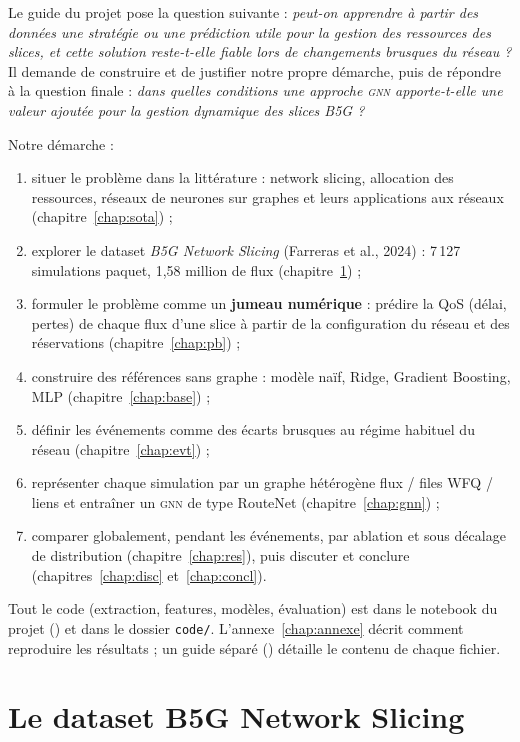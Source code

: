 \documentclass[11pt,a4paper]{report}
\newcommand{\gnn}{\textsc{gnn}}
\begin{document}
Le guide du projet pose la question suivante : \emph{peut-on apprendre à partir des données une stratégie ou une prédiction utile pour la gestion des ressources des slices, et cette solution reste-t-elle fiable lors de changements brusques du réseau ?} Il demande de construire et de justifier notre propre démarche, puis de répondre à la question finale : \emph{dans quelles conditions une approche \gnn{} apporte-t-elle une valeur ajoutée pour la gestion dynamique des slices B5G ?}

Notre démarche :
\begin{enumerate}[nosep]
  \item situer le problème dans la littérature : network slicing, allocation des ressources, réseaux de neurones sur graphes et leurs applications aux réseaux (chapitre~\ref{chap:sota}) ;
  \item explorer le dataset \emph{B5G Network Slicing} (Farreras et al., 2024) : 7\,127 simulations paquet, 1,58 million de flux (chapitre~\ref{chap:data}) ;
  \item formuler le problème comme un \textbf{jumeau numérique} : prédire la QoS (délai, pertes) de chaque flux d'une slice à partir de la configuration du réseau et des réservations (chapitre~\ref{chap:pb}) ;
  \item construire des références sans graphe : modèle naïf, Ridge, Gradient Boosting, MLP (chapitre~\ref{chap:base}) ;
  \item définir les événements comme des écarts brusques au régime habituel du réseau (chapitre~\ref{chap:evt}) ;
  \item représenter chaque simulation par un graphe hétérogène flux / files WFQ / liens et entraîner un \gnn{} de type RouteNet (chapitre~\ref{chap:gnn}) ;
  \item comparer globalement, pendant les événements, par ablation et sous décalage de distribution (chapitre~\ref{chap:res}), puis discuter et conclure (chapitres~\ref{chap:disc} et~\ref{chap:concl}).
\end{enumerate}
Tout le code (extraction, features, modèles, évaluation) est dans le notebook du projet () et dans le dossier \texttt{code/}. L'annexe~\ref{chap:annexe} décrit comment reproduire les résultats ; un guide séparé () détaille le contenu de chaque fichier.



\chapter{Le dataset B5G Network Slicing}\label{chap:data}
\end{document}
